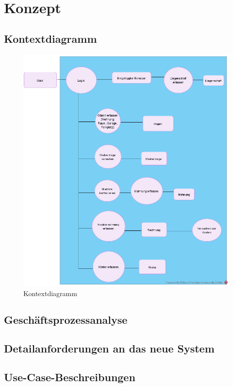 \section{Konzept}

\subsection{Kontextdiagramm}
\begin{figure}[H]
  \begin{center}
    \includegraphics[width=0.99\linewidth]{content/diagrams/out/contextdiagram/context.png}
    \caption{Kontextdiagramm}
  \end{center}
\end{figure}

\subsection{Geschäftsprozessanalyse}
\subsection{Detailanforderungen an das neue System}

\subsection{Use-Case-Beschreibungen}

